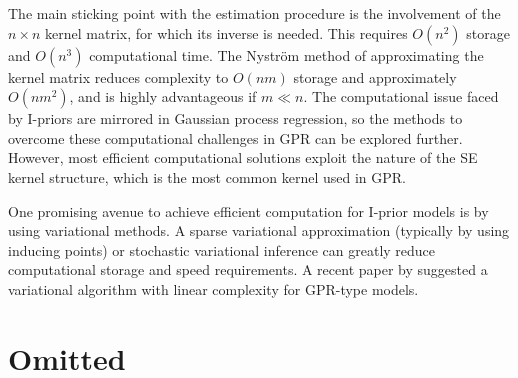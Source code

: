 \documentclass[a4paper,showframe,11pt]{report}
\begin{document}
The main sticking point with the estimation procedure is the involvement of the $n\times n$ kernel matrix, for which its inverse is needed.
This requires $O(n^2)$ storage and $O(n^3)$ computational time.
The Nyström method of approximating the kernel matrix reduces complexity to $O(nm)$ storage and approximately $O(nm^2)$, and is highly advantageous if $m \ll n$.
The computational issue faced by I-priors are mirrored in Gaussian process regression, so the methods to overcome these computational challenges in GPR can be explored further.
However, most efficient computational solutions exploit the nature of the SE kernel structure, which is the most common kernel used in GPR.

One promising avenue to achieve efficient computation for I-prior models is by using variational methods.
A sparse variational approximation (typically by using inducing points) or stochastic variational inference can greatly reduce computational storage and speed requirements.
A recent paper by \citet{cheng2017variational} suggested a variational algorithm with linear complexity for GPR-type models.


\section*{Omitted}


\hClosingStuffStandalone
\end{document}
